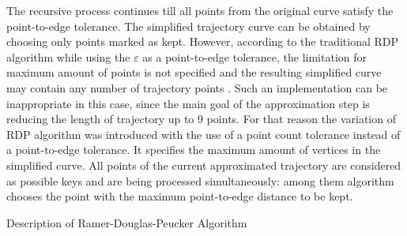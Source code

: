 The recursive process continues till all points from the original curve satisfy the point-to-edge tolerance. The simplified trajectory curve can be obtained by choosing only points marked as kept. However, according to the traditional RDP algorithm while using the $\varepsilon$ as a point-to-edge tolerance, the limitation for maximum amount of points is not specified and the resulting simplified curve may contain any number of trajectory points \cite{online:rdp_algo_var}. Such an implementation can be inappropriate in this case, since the main goal of the approximation step is reducing the length of trajectory up to 9 points. For that reason the variation of RDP algorithm was introduced with the use of a point count tolerance instead of a point-to-edge tolerance. It specifies the maximum amount of vertices in the simplified curve. All points of the current approximated trajectory are considered as possible keys and are being processed simultaneously: among them algorithm chooses the point with the maximum point-to-edge distance to be kept.

\begin{algorithm}[!htb]
	\caption{Description of Ramer-Douglas-Peucker Algorithm}
	\label{algo:rdp-algo}
	\SetAlgoLined
 \end{algorithm}

